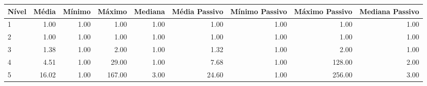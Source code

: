 \begin{table}[ht]
\centering
\begin{tabular}{lrrrrrrrr}
  \hline
Nível & Média & Mínimo & Máximo & Mediana & Média Passivo & Mínimo Passivo & Máximo Passivo & Mediana Passivo \\ 
  \hline
1 & 1.00 & 1.00 & 1.00 & 1.00 & 1.00 & 1.00 & 1.00 & 1.00 \\ 
  2 & 1.00 & 1.00 & 1.00 & 1.00 & 1.00 & 1.00 & 1.00 & 1.00 \\ 
  3 & 1.38 & 1.00 & 2.00 & 1.00 & 1.32 & 1.00 & 2.00 & 1.00 \\ 
  4 & 4.51 & 1.00 & 29.00 & 1.00 & 7.68 & 1.00 & 128.00 & 2.00 \\ 
  5 & 16.02 & 1.00 & 167.00 & 3.00 & 24.60 & 1.00 & 256.00 & 3.00 \\ 
   \hline
\end{tabular}
\end{table}
